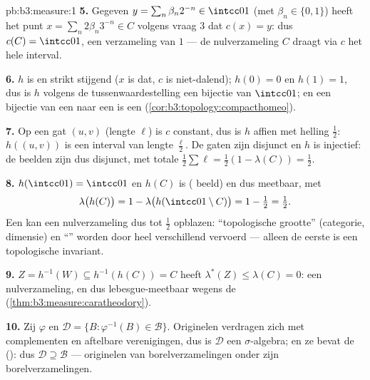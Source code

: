 \begin{solution}{pb:b3:measure:1}
\textbf{5.} Gegeven $y = \sum_n\beta_n2^{-n} \in \intcc01$ (met
$\beta_n \in \{0,1\}$) heeft het punt $x = \sum_n2\beta_n3^{-n}
\in C$ volgens vraag 3 dat $c(x) = y$: dus $c(C) = \intcc01$, een
verzameling van  $1$ --- de nulverzameling $C$ draagt via $c$
het hele interval.

\textbf{6.} $h$ is  en strikt stijgend ($x$ is dat, $c$ is
niet-dalend); $h(0) = 0$ en $h(1) = 1$, dus is $h$ volgens de
tussenwaardestelling een  bijectie van $\intcc01$; en een
 bijectie van een  naar een 
is een  (\cref{cor:b3:topology:compacthomeo}).

\textbf{7.} Op een gat $(u, v)$ (lengte $\ell$) is $c$ constant,
dus is $h$ affien met helling $\frac12$: $h((u,v))$ is een
interval van lengte $\frac\ell2$. De gaten zijn disjunct en $h$ is
injectief: de beelden zijn dus disjunct, met totale 
$\frac12\sum\ell = \frac12(1 - \lambda(C)) = \frac12$.

\textbf{8.} $h(\intcc01) = \intcc01$ en $h(C)$ is 
( beeld) en dus meetbaar, met
\[
\lambda\bigl(h(C)\bigr) = 1 -
\lambda\bigl(h(\intcc01\setminus C)\bigr) = 1 - \tfrac12 =
\tfrac12 .
\]
Een  kan een nulverzameling dus tot  $\frac12$
opblazen: ``topologische grootte'' (categorie, dimensie) en
``'' worden door  heel verschillend vervoerd ---
alleen de eerste is een topologische invariant.

\textbf{9.} $Z = h^{-1}(W) \subseteq h^{-1}(h(C)) = C$ heeft
$\lambda^*(Z) \leq \lambda(C) = 0$: een nulverzameling, en dus
lebesgue-meetbaar wegens de 
(\cref{thm:b3:measure:caratheodory}).

\textbf{10.} Zij $\varphi$  en $\mathcal D = \{B :
\varphi^{-1}(B) \in \mathcal B\}$. Originelen verdragen zich met
complementen en aftelbare verenigingen, dus is $\mathcal D$ een
$\sigma$-algebra; en ze bevat de 
(): dus $\mathcal D \supseteq \mathcal B$ ---
originelen van borelverzamelingen onder  zijn
borelverzamelingen.


\end{solution}

